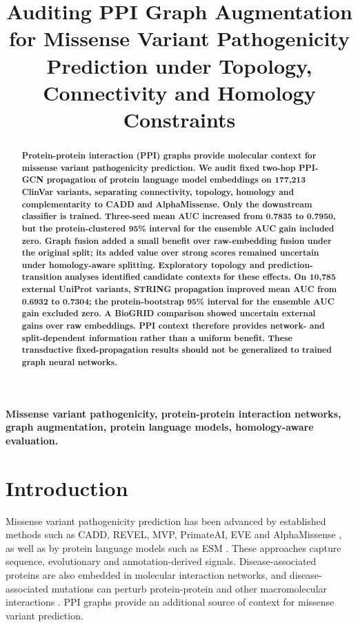 \documentclass[conference]{IEEEtran}
\title{Auditing PPI Graph Augmentation for Missense Variant Pathogenicity Prediction under Topology, Connectivity and Homology Constraints}
\author{}
\begin{document}
\maketitle


\begin{abstract}
\bfseries\boldmath
Protein-protein interaction (PPI) graphs provide molecular context for missense variant pathogenicity prediction. We audit fixed two-hop PPI-GCN propagation of protein language model embeddings on 177,213 ClinVar variants, separating connectivity, topology, homology and complementarity to CADD and AlphaMissense. Only the downstream classifier is trained. Three-seed mean AUC increased from 0.7835 to 0.7950, but the protein-clustered 95\% interval for the ensemble AUC gain included zero. Graph fusion added a small benefit over raw-embedding fusion under the original split; its added value over strong scores remained uncertain under homology-aware splitting. Exploratory topology and prediction-transition analyses identified candidate contexts for these effects. On 10,785 external UniProt variants, STRING propagation improved mean AUC from 0.6932 to 0.7304; the protein-bootstrap 95\% interval for the ensemble AUC gain excluded zero. A BioGRID comparison showed uncertain external gains over raw embeddings. PPI context therefore provides network- and split-dependent information rather than a uniform benefit. These transductive fixed-propagation results should not be generalized to trained graph neural networks.

\end{abstract}

\begin{IEEEkeywords}
\bfseries\boldmath
Missense variant pathogenicity, protein-protein interaction networks, graph augmentation, protein language models, homology-aware evaluation.
\end{IEEEkeywords}

\section{Introduction}

Missense variant pathogenicity prediction has been advanced by established methods such as CADD, REVEL, MVP, PrimateAI, EVE and AlphaMissense \cite{Kircher2014CADD,Ioannidis2016REVEL,Qi2021MVP,Sundaram2018PrimateAI,Frazer2021EVE,Cheng2023AlphaMissense}, as well as by protein language models such as ESM \cite{Lin2023ESM}. These approaches capture sequence, evolutionary and annotation-derived signals. Disease-associated proteins are also embedded in molecular interaction networks, and disease-associated mutations can perturb protein-protein and other macromolecular interactions \cite{Barabasi2011NetworkMedicine,Menche2015DiseaseModules,Sahni2015InteractionPerturbation,Chen2018InteractomePerturbation}. PPI graphs provide an additional source of context for missense variant prediction.
\end{document}
